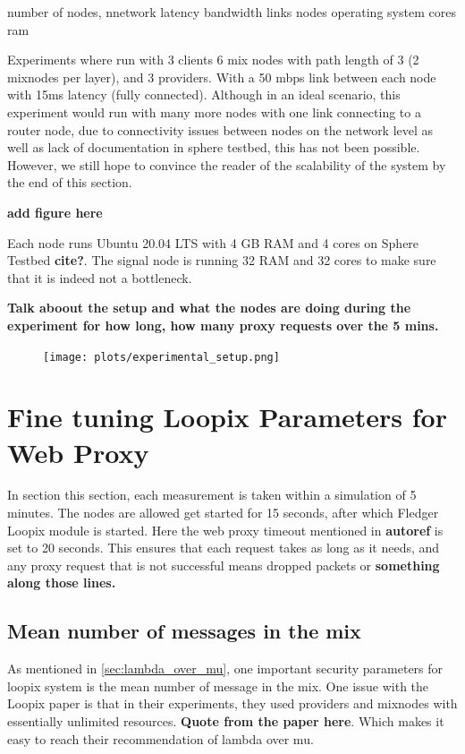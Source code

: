 \documentclass[a4paper,11pt,oneside]{report}
\begin{document}
number of nodes,
nnetwork latency bandwidth links
nodes operating system cores ram

Experiments where run with 3 clients 6 mix nodes with path length of 3 (2 mixnodes per layer), and 3 providers. With a 50 mbps link between each node with 15ms latency (fully connected). Although in an ideal scenario, this experiment would run with many more nodes with one link connecting to a router node, due to connectivity issues between nodes on the network level as well as lack of documentation in sphere testbed, this has not been possible. However, we still hope to convince the reader of the scalability of the system by the end of this section. 

\textbf{add figure here}

Each node runs Ubuntu 20.04 LTS with 4 GB RAM and 4 cores on Sphere Testbed \textbf{cite?}. The signal node is running 32 RAM and 32 cores to make sure that it is indeed not a bottleneck.


\textbf{Talk aboout the setup and what the nodes are doing during the experiment for how long, how many proxy requests over the 5 mins.}
\begin{figure}[H]
    \centering
    \texttt{[image: plots/experimental\_setup.png]}
    \caption{}
    \label{fig:setup}
\end{figure}

\section{Fine tuning Loopix Parameters for Web Proxy}
\label{sec:finetune}
In section this section, each measurement is taken within a simulation of 5 minutes. The nodes are allowed get started for 15 seconds, after which Fledger Loopix module is started. Here the web proxy timeout mentioned in \textbf{autoref} is set to 20 seconds. This ensures that each request takes as long as it needs, and any proxy request that is not successful means dropped packets or \textbf{something along those lines.}
\subsection{Mean number of messages in the mix}
As mentioned in \autoref{sec:lambda_over_mu}, one important security parameters for loopix system is the mean number of message in the mix. One issue with the Loopix paper is that in their experiments, they used providers and mixnodes with essentially unlimited resources. \textbf{Quote from the paper here}. Which makes it easy to reach their recommendation of lambda over mu.
\end{document}
